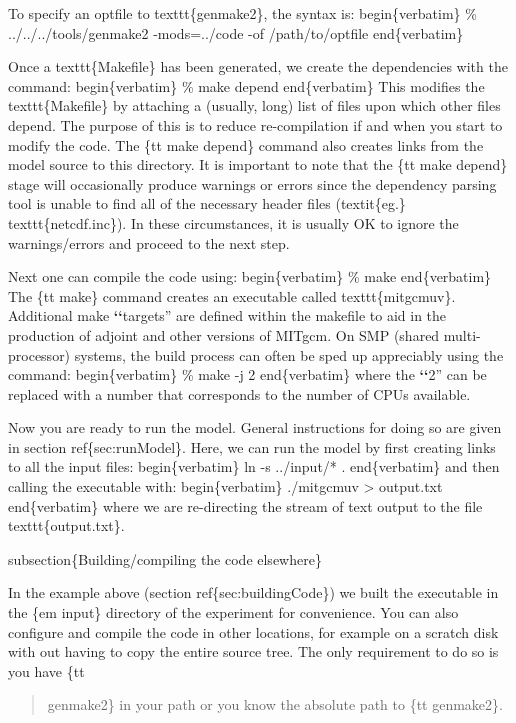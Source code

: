 \documentclass[letterpaper,10pt,english]{sphinxmanual}
\begin{document}
To specify an optfile to texttt\{genmake2\}, the syntax is:
begin\{verbatim\}
\% ../../../tools/genmake2 -mods=../code -of /path/to/optfile
end\{verbatim\}

Once a texttt\{Makefile\} has been generated, we create the
dependencies with the command:
begin\{verbatim\}
\% make depend
end\{verbatim\}
This modifies the texttt\{Makefile\} by attaching a (usually, long)
list of files upon which other files depend. The purpose of this is to
reduce re-compilation if and when you start to modify the code. The
\{tt make depend\} command also creates links from the model source to
this directory.  It is important to note that the \{tt make depend\}
stage will occasionally produce warnings or errors since the
dependency parsing tool is unable to find all of the necessary header
files (textit\{eg.\}  texttt\{netcdf.inc\}).  In these circumstances, it
is usually OK to ignore the warnings/errors and proceed to the next
step.

Next one can compile the code using:
begin\{verbatim\}
\% make
end\{verbatim\}
The \{tt make\} command creates an executable called texttt\{mitgcmuv\}.
Additional make {\color{red}\bfseries{}{}`{}`}targets'' are defined within the makefile to aid in
the production of adjoint and other versions of MITgcm.  On SMP
(shared multi-processor) systems, the build process can often be sped
up appreciably using the command:
begin\{verbatim\}
\% make -j 2
end\{verbatim\}
where the {\color{red}\bfseries{}{}`{}`}2'' can be replaced with a number that corresponds to the
number of CPUs available.

Now you are ready to run the model. General instructions for doing so are
given in section ref\{sec:runModel\}. Here, we can run the model by
first creating links to all the input files:
begin\{verbatim\}
ln -s ../input/* .
end\{verbatim\}
and then calling the executable with:
begin\{verbatim\}
./mitgcmuv \textgreater{} output.txt
end\{verbatim\}
where we are re-directing the stream of text output to the file
texttt\{output.txt\}.

subsection\{Building/compiling the code elsewhere\}

In the example above (section ref\{sec:buildingCode\}) we built the
executable in the \{em input\} directory of the experiment for
convenience. You can also configure and compile the code in other
locations, for example on a scratch disk with out having to copy the
entire source tree. The only requirement to do so is you have \{tt
\begin{quote}

genmake2\} in your path or you know the absolute path to \{tt
genmake2\}.
\end{quote}
\end{document}
